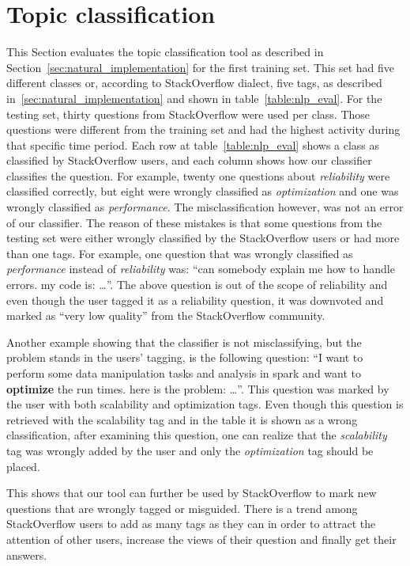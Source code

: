 \section{Topic classification}
\label{sec:nlp_evaluation}
This Section evaluates the topic classification tool as described in Section~\ref{sec:natural_implementation} for the first training set. This set had five different classes or, according to StackOverflow dialect, five tags, as described in~\ref{sec:natural_implementation} and shown in table~\ref{table:nlp_eval}. For the testing set, thirty questions from StackOverflow were used per class. Those questions were different from the training set and had the highest activity during that specific time period. Each row at table~\ref{table:nlp_eval} shows a class as classified by StackOverflow users, and each column shows how our classifier classifies the question. For example, twenty one questions about \emph{reliability} were classified correctly, but eight were wrongly classified as \emph{optimization} and one was wrongly classified as \emph{performance}. The misclassification however, was not an error of our classifier. The reason of these mistakes is that  some questions from the testing set were either wrongly classified by the StackOverflow users or had more than one tags. For example, one question that was wrongly classified as \emph{performance} instead of \emph{reliability} was: ``can somebody explain me how to handle errors. my code is: \ldots''. The above question is out of the scope of reliability and even though the user tagged it as a reliability question, it was downvoted and marked as ``very low quality'' from the StackOverflow community.

Another example showing that the classifier is not misclassifying, but the problem stands in the users' tagging, is the following question:
``I want to perform some data manipulation tasks and analysis in spark and want to \textbf{optimize} the run times. 
here is the problem: \ldots ''. 
This question was marked by the user with both scalability and optimization tags. Even though this question is retrieved with the scalability tag and in the table it is shown as a wrong classification, after examining this question, one can realize that the \emph{scalability} tag was wrongly added by the user and only the \emph{optimization} tag should be placed.

This shows that our tool can further be used by StackOverflow to mark new questions that are wrongly tagged or misguided. There is a trend among StackOverflow users to add as many tags as they can in order to attract the attention of other users, increase the views of their question and finally get their answers.  

